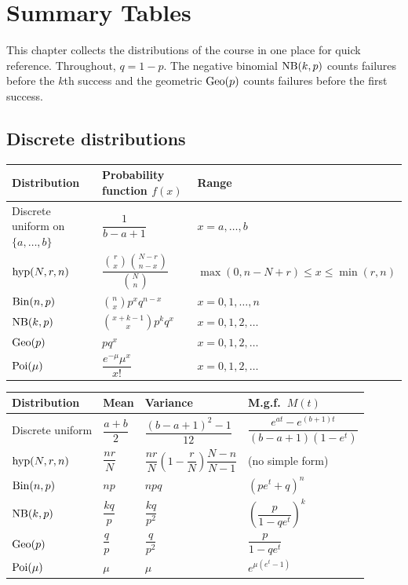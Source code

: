 \chapter{Summary Tables}

This chapter collects the distributions of the course in one place for quick reference.
Throughout, $q = 1-p$. The negative binomial $\operatorname{NB}(k,p)$ counts failures before the $k$th
success and the geometric $\operatorname{Geo}(p)$ counts failures before the first success.

\section{Discrete distributions}

\begin{center}
\renewcommand{\arraystretch}{1.6}
\begin{tabular}{lll}
\toprule
Distribution & Probability function $f(x)$ & Range \\
\midrule
Discrete uniform on $\{a,\dots,b\}$ & $\dfrac{1}{b-a+1}$ & $x = a,\dots,b$ \\
$\operatorname{hyp}(N,r,n)$ & $\dfrac{\binom rx\binom{N-r}{n-x}}{\binom Nn}$ & $\max(0,n-N+r)\le x\le\min(r,n)$ \\
$\operatorname{Bin}(n,p)$ & $\binom nx p^xq^{n-x}$ & $x = 0,1,\dots,n$ \\
$\operatorname{NB}(k,p)$ & $\binom{x+k-1}{x}p^kq^x$ & $x = 0,1,2,\dots$ \\
$\operatorname{Geo}(p)$ & $pq^x$ & $x = 0,1,2,\dots$ \\
$\operatorname{Poi}(\mu)$ & $\dfrac{e^{-\mu}\mu^x}{x!}$ & $x = 0,1,2,\dots$ \\
\bottomrule
\end{tabular}
\end{center}

\begin{center}
\renewcommand{\arraystretch}{1.6}
\begin{tabular}{llll}
\toprule
Distribution & Mean & Variance & M.g.f.\ $M(t)$ \\
\midrule
Discrete uniform & $\dfrac{a+b}{2}$ & $\dfrac{(b-a+1)^2-1}{12}$ & $\dfrac{e^{at}-e^{(b+1)t}}{(b-a+1)(1-e^t)}$ \\
$\operatorname{hyp}(N,r,n)$ & $\dfrac{nr}{N}$ & $\dfrac{nr}{N}\left(1-\dfrac rN\right)\dfrac{N-n}{N-1}$ & (no simple form) \\
$\operatorname{Bin}(n,p)$ & $np$ & $npq$ & $(pe^t+q)^n$ \\
$\operatorname{NB}(k,p)$ & $\dfrac{kq}{p}$ & $\dfrac{kq}{p^2}$ & $\left(\dfrac{p}{1-qe^t}\right)^k$ \\
$\operatorname{Geo}(p)$ & $\dfrac{q}{p}$ & $\dfrac{q}{p^2}$ & $\dfrac{p}{1-qe^t}$ \\
$\operatorname{Poi}(\mu)$ & $\mu$ & $\mu$ & $e^{\mu(e^t-1)}$ \\
\bottomrule
\end{tabular}
\end{center}

